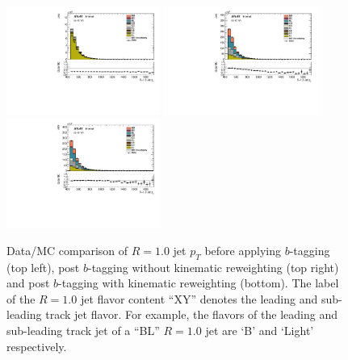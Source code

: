\begin{figure}[htbp]
  \centering
 \includegraphics[width=0.45\textwidth]{figures/gbb/LargeRJet_pT_NoReweight.pdf}
 \includegraphics[width=0.45\textwidth]{figures/gbb/LargeRJet_pT_PreReweight.pdf}\\ 
 \includegraphics[width=0.45\textwidth]{figures/gbb/LargeRJet_pT_Reweight.pdf}
\caption{Data/MC comparison of $R=1.0$ jet $p_T$ before applying $b$-tagging (top left), post $b$-tagging without kinematic reweighting (top right) and post $b$-tagging with kinematic reweighting (bottom). The label of the $R=1.0$ jet flavor content ``XY'' denotes the leading and sub-leading track jet flavor. For example, the flavors of the leading and sub-leading track jet of a ``BL'' $R=1.0$ jet are `B' and `Light' respectively.}
  \label{fig:gbb-pT_largeR}
\end{figure}


